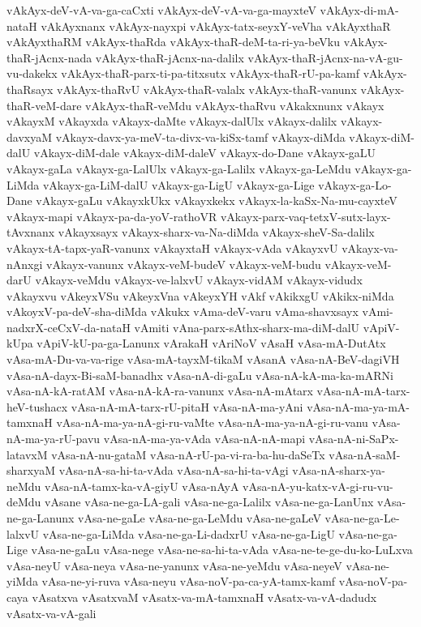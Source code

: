 {vAkAyx-deV-vA-va-ga-caCxti
vAkAyx-deV-vA-va-ga-mayxteV
vAkAyx-di-mA-nataH
vAkAyxnanx
vAkAyx-nayxpi
vAkAyx-tatx-seyxY-veVha
vAkAyxthaR
vAkAyxthaRM
vAkAyx-thaRda
vAkAyx-thaR-deM-ta-ri-ya-beVku
vAkAyx-thaR-jAcnx-nada
vAkAyx-thaR-jAcnx-na-dalilx
vAkAyx-thaR-jAcnx-na-vA-gu-vu-dakekx
vAkAyx-thaR-parx-ti-pa-titxsutx
vAkAyx-thaR-rU-pa-kamf
vAkAyx-thaRsayx
vAkAyx-thaRvU
vAkAyx-thaR-valalx
vAkAyx-thaR-vanunx
vAkAyx-thaR-veM-dare
vAkAyx-thaR-veMdu
vAkAyx-thaRvu
vAkakxnunx
vAkayx
vAkayxM
vAkayxda
vAkayx-daMte
vAkayx-dalUlx
vAkayx-dalilx
vAkayx-davxyaM
vAkayx-davx-ya-meV-ta-divx-va-kiSx-tamf
vAkayx-diMda
vAkayx-diM-dalU
vAkayx-diM-dale
vAkayx-diM-daleV
vAkayx-do-Dane
vAkayx-gaLU
vAkayx-gaLa
vAkayx-ga-LalUlx
vAkayx-ga-Lalilx
vAkayx-ga-LeMdu
vAkayx-ga-LiMda
vAkayx-ga-LiM-dalU
vAkayx-ga-LigU
vAkayx-ga-Lige
vAkayx-ga-Lo-Dane
vAkayx-gaLu
vAkayxkUkx
vAkayxkekx
vAkayx-la-kaSx-Na-mu-cayxteV
vAkayx-mapi
vAkayx-pa-da-yoV-rathoVR
vAkayx-parx-vaq-tetxV-sutx-layx-tAvxnanx
vAkayxsayx
vAkayx-sharx-va-Na-diMda
vAkayx-sheV-Sa-dalilx
vAkayx-tA-tapx-yaR-vanunx
vAkayxtaH
vAkayx-vAda
vAkayxvU
vAkayx-va-nAnxgi
vAkayx-vanunx
vAkayx-veM-budeV
vAkayx-veM-budu
vAkayx-veM-darU
vAkayx-veMdu
vAkayx-ve-lalxvU
vAkayx-vidAM
vAkayx-vidudx
vAkayxvu
vAkeyxVSu
vAkeyxVna
vAkeyxYH
vAkf
vAkikxgU
vAkikx-niMda
vAkoyxV-pa-deV-sha-diMda
vAkukx
vAma-deV-varu
vAma-shavxsayx
vAmi-nadxrX-ceCxV-da-nataH
vAmiti
vAna-parx-sAthx-sharx-ma-diM-dalU
vApiV-kUpa
vApiV-kU-pa-ga-Lanunx
vArakaH
vAriNoV
vAsaH
vAsa-mA-DutAtx
vAsa-mA-Du-va-va-rige
vAsa-mA-tayxM-tikaM
vAsanA
vAsa-nA-BeV-dagiVH
vAsa-nA-dayx-Bi-saM-banadhx
vAsa-nA-di-gaLu
vAsa-nA-kA-ma-ka-mARNi
vAsa-nA-kA-ratAM
vAsa-nA-kA-ra-vanunx
vAsa-nA-mAtarx
vAsa-nA-mA-tarx-heV-tushacx
vAsa-nA-mA-tarx-rU-pitaH
vAsa-nA-ma-yAni
vAsa-nA-ma-ya-mA-tamxnaH
vAsa-nA-ma-ya-nA-gi-ru-vaMte
vAsa-nA-ma-ya-nA-gi-ru-vanu
vAsa-nA-ma-ya-rU-pavu
vAsa-nA-ma-ya-vAda
vAsa-nA-nA-mapi
vAsa-nA-ni-SaPx-latavxM
vAsa-nA-nu-gataM
vAsa-nA-rU-pa-vi-ra-ba-hu-daSeTx
vAsa-nA-saM-sharxyaM
vAsa-nA-sa-hi-ta-vAda
vAsa-nA-sa-hi-ta-vAgi
vAsa-nA-sharx-ya-neMdu
vAsa-nA-tamx-ka-vA-giyU
vAsa-nAyA
vAsa-nA-yu-katx-vA-gi-ru-vu-deMdu
vAsane
vAsa-ne-ga-LA-gali
vAsa-ne-ga-Lalilx
vAsa-ne-ga-LanUnx
vAsa-ne-ga-Lanunx
vAsa-ne-gaLe
vAsa-ne-ga-LeMdu
vAsa-ne-gaLeV
vAsa-ne-ga-Le-lalxvU
vAsa-ne-ga-LiMda
vAsa-ne-ga-Li-dadxrU
vAsa-ne-ga-LigU
vAsa-ne-ga-Lige
vAsa-ne-gaLu
vAsa-nege
vAsa-ne-sa-hi-ta-vAda
vAsa-ne-te-ge-du-ko-LuLxva
vAsa-neyU
vAsa-neya
vAsa-ne-yanunx
vAsa-ne-yeMdu
vAsa-neyeV
vAsa-ne-yiMda
vAsa-ne-yi-ruva
vAsa-neyu
vAsa-noV-pa-ca-yA-tamx-kamf
vAsa-noV-pa-caya
vAsatxva
vAsatxvaM
vAsatx-va-mA-tamxnaH
vAsatx-va-vA-dadudx
vAsatx-va-vA-gali
}
